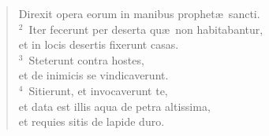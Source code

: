 \begin{flushleft}\begin{verse}\vspace{-19pt}\hspace{6pt}Direxit opera eorum in manibus prophet\ae\ sancti.\\\hspace{6pt}
${}^{2}$~Iter fecerunt per deserta qu\ae\ non habitabantur,\\ et in locis desertis fixerunt casas.\\
${}^{3}$~Steterunt contra hostes,\\ et de inimicis se vindicaverunt.\\
${}^{4}$~Sitierunt, et invocaverunt te,\\ et data est illis aqua de petra altissima,\\ et requies sitis de lapide duro.\end{verse}\end{flushleft}


